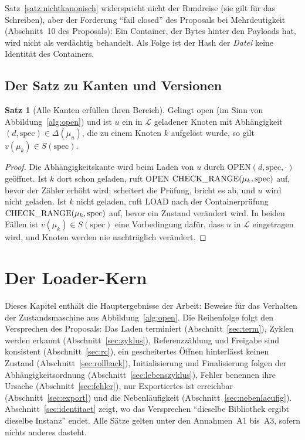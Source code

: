 \documentclass[a4paper,12pt,twoside]{report}
\DeclareRobustCommand{\_}{\ifmmode\mbox{\textunderscore}\else\textunderscore\allowbreak{}\fi}
\theoremstyle{definition}
\newtheorem{satz}{Satz}[chapter]
\begin{document}
Satz~\ref{satz:nichtkanonisch} widerspricht nicht der Rundreise (sie gilt für das Schreiben), aber der Forderung ``fail closed'' des Proposals bei Mehrdeutigkeit (Abschnitt~10 des Proposals): Ein Container, der Bytes hinter den Payloads hat, wird nicht als verdächtig behandelt. Als Folge ist der Hash der \emph{Datei} keine Identität des Containers.

\section{Der Satz zu Kanten und Versionen}

\begin{satz}[Alle Kanten erfüllen ihren Bereich]
	\label{satz:kanten}
	Gelingt $\mathrm{open}$ (im Sinn von Abbildung~\ref{alg:open}) und ist $u$ ein in $\mathcal L$ geladener Knoten mit Abhängigkeit $(d,\mathrm{spec})\in\Delta(\mu_u)$, die zu einem Knoten $k$ aufgelöst wurde, so gilt $v(\mu_k)\in S(\mathrm{spec})$.
\end{satz}

\begin{proof}
	Die Abhängigkeitskante wird beim Laden von $u$ durch $\mathrm{OPEN}(d,\mathrm{spec},\cdot)$ geöffnet. Ist $k$ dort schon geladen, ruft OPEN $\mathrm{CHECK\_RANGE}(\mu_k,\mathrm{spec})$ auf, bevor der Zähler erhöht wird; scheitert die Prüfung, bricht es ab, und $u$ wird nicht geladen. Ist $k$ nicht geladen, ruft LOAD nach der Containerprüfung $\mathrm{CHECK\_RANGE}(\mu_k,\mathrm{spec})$ auf, bevor ein Zustand verändert wird. In beiden Fällen ist $v(\mu_k)\in S(\mathrm{spec})$ eine Vorbedingung dafür, dass $u$ in $\mathcal L$ eingetragen wird, und Knoten werden nie nachträglich verändert.
\end{proof}


\chapter{Der Loader-Kern}
\label{chap:loader}

Dieses Kapitel enthält die Hauptergebnisse der Arbeit: Beweise für das Verhalten der Zustandsmaschine aus Abbildung~\ref{alg:open}. Die Reihenfolge folgt den Versprechen des Proposals: Das Laden terminiert (Abschnitt~\ref{sec:term}), Zyklen werden erkannt (Abschnitt~\ref{sec:zyklus}), Referenzzählung und Freigabe sind konsistent (Abschnitt~\ref{sec:rc}), ein gescheitertes Öffnen hinterlässt keinen Zustand (Abschnitt~\ref{sec:rollback}), Initialisierung und Finalisierung folgen der Abhängigkeitsordnung (Abschnitt~\ref{sec:lebenszyklus}), Fehler benennen ihre Ursache (Abschnitt~\ref{sec:fehler}), nur Exportiertes ist erreichbar (Abschnitt~\ref{sec:export}) und die Nebenläufigkeit (Abschnitt~\ref{sec:nebenlaeufig}). Abschnitt~\ref{sec:identitaet} zeigt, wo das Versprechen ``dieselbe Bibliothek ergibt dieselbe Instanz'' endet. Alle Sätze gelten unter den Annahmen~A1 bis~A3, sofern nichts anderes dasteht.
\end{document}
